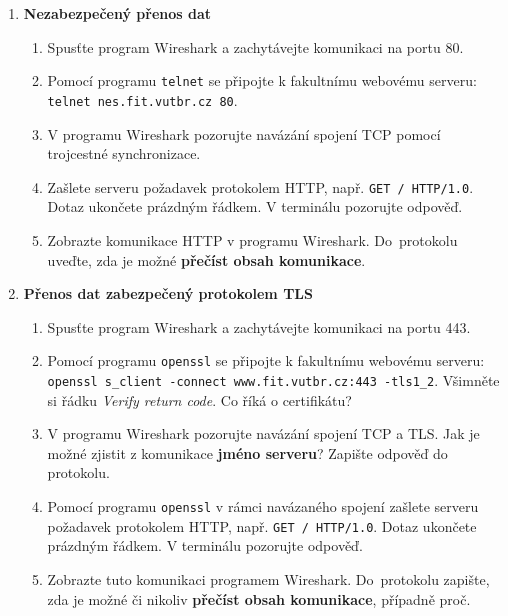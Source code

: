 \documentclass[a4paper,11pt]{article}
\begin{document}

\begin{enumerate}

  \item {\bf  Nezabezpečený přenos dat}
    \begin{enumerate}
      \item Spusťte program Wireshark a zachytávejte komunikaci na portu 80.
      \item Pomocí programu {\tt telnet} se připojte k fakultnímu webovému
        serveru: \\ \verb|telnet nes.fit.vutbr.cz 80|.
      \item V programu Wireshark pozorujte navázání spojení TCP pomocí
        trojcestné synchronizace.
      \item Zašlete serveru požadavek protokolem HTTP, např. \verb|GET / HTTP/1.0|. Dotaz ukončete prázdným řádkem. V terminálu pozorujte   odpověď.
      \item Zobrazte komunikace HTTP v programu Wireshark.  Do~protokolu uveďte, zda je možné \textbf{přečíst obsah komunikace}.
    \end{enumerate}

  \item {\bf Přenos dat zabezpečený protokolem TLS}

    \begin{enumerate}
      \item Spusťte program Wireshark a zachytávejte komunikaci na portu 443.
      \item Pomocí programu {\tt openssl} se připojte k fakultnímu webovému
        serveru: \\ \verb|openssl s_client -connect www.fit.vutbr.cz:443 -tls1_2|.
        Všimněte si řádku \emph{Verify return code}. Co říká o certifikátu?

      \item V programu Wireshark pozorujte navázání spojení TCP a TLS. Jak je možné zjistit z komunikace \textbf{jméno serveru}? Zapište odpověď do protokolu.

      \item Pomocí programu \texttt{openssl} v rámci navázaného spojení zašlete serveru požadavek protokolem HTTP, např. \verb|GET / HTTP/1.0|. Dotaz ukončete prázdným řádkem. V terminálu pozorujte odpověď.

      \item Zobrazte tuto komunikaci programem Wireshark.  Do~protokolu zapište, zda je možné či nikoliv \textbf{přečíst obsah komunikace}, případně proč. 


\end{enumerate}
\end{enumerate}
\end{document}
